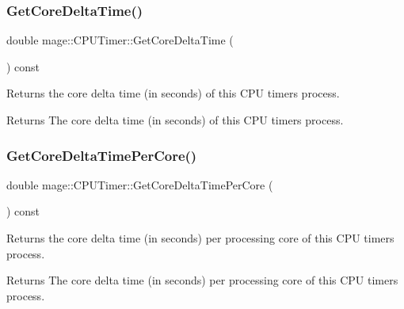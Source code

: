 \subsubsection{\texorpdfstring{Get\+Core\+Delta\+Time()}{GetCoreDeltaTime()}}
{\footnotesize\ttfamily double mage\+::\+C\+P\+U\+Timer\+::\+Get\+Core\+Delta\+Time (\begin{DoxyParamCaption}{ }\end{DoxyParamCaption}) const\hspace{0.3cm}{\ttfamily [noexcept]}}

Returns the core delta time (in seconds) of this C\+PU timer\textquotesingle{}s process.

\begin{DoxyReturn}{Returns}
The core delta time (in seconds) of this C\+PU timer\textquotesingle{}s process. 
\end{DoxyReturn}
\hypertarget{classmage_1_1_c_p_u_timer_a34a75e0198d62dc54fa3a8b179e7dd58}{}\label{classmage_1_1_c_p_u_timer_a34a75e0198d62dc54fa3a8b179e7dd58} 
\subsubsection{\texorpdfstring{Get\+Core\+Delta\+Time\+Per\+Core()}{GetCoreDeltaTimePerCore()}}
{\footnotesize\ttfamily double mage\+::\+C\+P\+U\+Timer\+::\+Get\+Core\+Delta\+Time\+Per\+Core (\begin{DoxyParamCaption}{ }\end{DoxyParamCaption}) const\hspace{0.3cm}{\ttfamily [noexcept]}}

Returns the core delta time (in seconds) per processing core of this C\+PU timer\textquotesingle{}s process.

\begin{DoxyReturn}{Returns}
The core delta time (in seconds) per processing core of this C\+PU timer\textquotesingle{}s process. 
\end{DoxyReturn}
\hypertarget{classmage_1_1_c_p_u_timer_af2df68d4661e7275d15b8c548ed62fbb}{}\label{classmage_1_1_c_p_u_timer_af2df68d4661e7275d15b8c548ed62fbb} 

